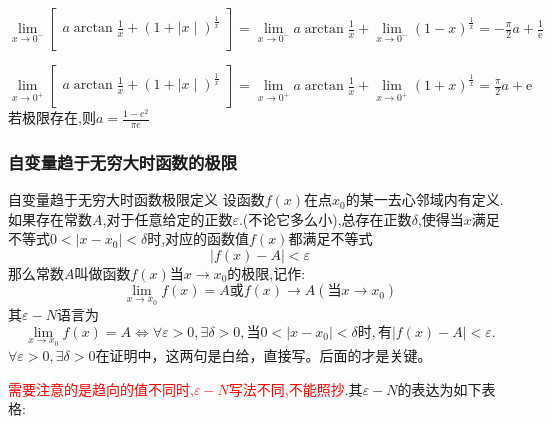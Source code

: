 \documentclass[12pt, a4paper, oneside, UTF8]{ctexbook}
\begin{document}
\begin{sloppypar}
\begin{solution}
        $\lim\limits_{x\to0^{-}}\left[\begin{matrix}a\arctan\frac{1}{x}+(1+\mid x\mid)^{\frac{1}{x}}\\\end{matrix}\right]=\lim\limits_{x\to0^{-}}a\arctan\frac{1}{x}+\lim\limits_{x\to0^{-}}(1-x)^{\frac{1}{x}}=-\frac{\pi}{2}a+\frac{1}{\text{e}}$

        $\lim\limits_{x\to0^+}\left[\begin{matrix}a\arctan\frac{1}{x}+(1+\mid x\mid)^{\frac{1}{x}}\\\end{matrix}\right]=\lim\limits_{x\to0^+}a\arctan\frac{1}{x}+\lim\limits_{x\to0^+}(1+x)^{\frac{1}{x}}=\frac{\pi}{2}a+\mathrm{e}$
        若极限存在,则$a=\frac{1-e^2}{\pi e}$
    \end{solution}
    \subsubsection{自变量趋于无穷大时函数的极限}
    \begin{defn}{自变量趋于无穷大时函数极限定义}{}
        设函数$f(x)$在点$x_0$的某一去心邻域内有定义.如果存在常数$A$,对于任意给定的正数$\varepsilon$.(不论它多么小),总存在正数$\delta$,使得当$x$满足不等式$0<|x-x_0|<\delta$时,对应的函数值$f(x)$都满足不等式
        $$
            |f(x)-A|<\varepsilon
        $$
        那么常数$A$叫做函数$f(x)$当$x \to x_0$的极限,记作:
        $$
            \lim_{x\to x_0}f(x)=A\text{或}f(x)\to A(\text{当}x\to x_0)
        $$
        其$\varepsilon-N$语言为
        $$
            \lim\limits_{x\to x_0}f(x)=A\Leftrightarrow\forall\varepsilon>0,\exists\delta>0,\text{当}0<|x-x_0|<\delta\text{时},\text{有}|f(x)-A|<\varepsilon.
        $$
        $\forall\varepsilon>0,\exists\delta>0$在证明中，这两句是白给，直接写。后面的才是关键。
    \end{defn}
    \textcolor{red}{需要注意的是趋向的值不同时,$\varepsilon -N$写法不同,不能照抄}.其$\varepsilon -N$的表达为如下表格:
    \begin{center}
        \tabletail{
}
\end{center}
\end{sloppypar}
\end{document}

